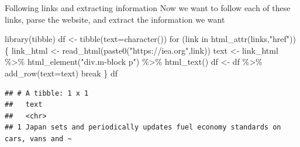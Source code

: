 \documentclass[
  10pt,
  ignorenonframetext,
  aspectratio=169]{beamer}
\newenvironment{Shaded}{\begin{snugshade}}{\end{snugshade}}
\newcommand{\AttributeTok}[1]{\textcolor[rgb]{0.80,0.80,0.80}{#1}}
\newcommand{\ControlFlowTok}[1]{\textcolor[rgb]{0.94,0.87,0.69}{#1}}
\newcommand{\FunctionTok}[1]{\textcolor[rgb]{0.94,0.94,0.56}{#1}}
\newcommand{\NormalTok}[1]{\textcolor[rgb]{0.80,0.80,0.80}{#1}}
\newcommand{\OtherTok}[1]{\textcolor[rgb]{0.94,0.94,0.56}{#1}}
\newcommand{\SpecialCharTok}[1]{\textcolor[rgb]{0.86,0.64,0.64}{#1}}
\newcommand{\StringTok}[1]{\textcolor[rgb]{0.80,0.58,0.58}{#1}}
\begin{document}
\begin{frame}[fragile]{Following links and extracting information}
\protect\hypertarget{following-links-and-extracting-information}{}
Now we want to follow each of these links, parse the website, and
extract the information we want

\scriptsize

\begin{Shaded}
\begin{Highlighting}[]
\FunctionTok{library}\NormalTok{(tibble)}
\NormalTok{df }\OtherTok{\textless{}{-}} \FunctionTok{tibble}\NormalTok{(}\AttributeTok{text=}\FunctionTok{character}\NormalTok{())}
\ControlFlowTok{for}\NormalTok{ (link }\ControlFlowTok{in} \FunctionTok{html\_attr}\NormalTok{(links,}\StringTok{"href"}\NormalTok{)) \{}
\NormalTok{  link\_html }\OtherTok{\textless{}{-}} \FunctionTok{read\_html}\NormalTok{(}\FunctionTok{paste0}\NormalTok{(}\StringTok{"https://iea.org"}\NormalTok{,link))}
\NormalTok{  text }\OtherTok{\textless{}{-}}\NormalTok{ link\_html }\SpecialCharTok{\%\textgreater{}\%} \FunctionTok{html\_element}\NormalTok{(}\StringTok{"div.m{-}block p"}\NormalTok{) }\SpecialCharTok{\%\textgreater{}\%} \FunctionTok{html\_text}\NormalTok{()}
\NormalTok{  df }\OtherTok{\textless{}{-}}\NormalTok{ df }\SpecialCharTok{\%\textgreater{}\%} \FunctionTok{add\_row}\NormalTok{(}\AttributeTok{text=}\NormalTok{text)}
  \ControlFlowTok{break}
\NormalTok{\}}
\NormalTok{df}
\end{Highlighting}
\end{Shaded}

\begin{verbatim}
## # A tibble: 1 x 1
##   text                                                                          
##   <chr>                                                                         
## 1 Japan sets and periodically updates fuel economy standards on cars, vans and ~
\end{verbatim}
\end{frame}
\end{document}
